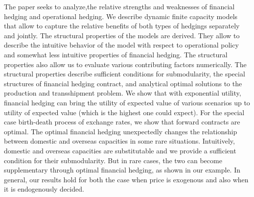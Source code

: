 \documentclass[mnsc,nonblindrev,copyedit]{informs2_wz} %
\begin{document}
The paper seeks to analyze,the relative strengths and weaknesses of financial hedging and operational hedging.  We describe dynamic finite capacity models that allow to capture the relative benefits of both types of hedgings separately and jointly.  The structural properties of the models are derived.  They allow to describe the intuitive behavior of the model with respect to operational policy and somewhat less intuitive properties of financial hedging.  The structural properties also allow us to evaluate various contributing factors numerically.  The structural properties describe sufficient conditions for submodularity, the special structures of financial hedging contract, and analytical optimal solutions to the production and transshipment problem.  We show that with exponential utility, financial hedging can bring the utility of expected value of various scenarios up to utility of expected value (which is the highest one could expect).  For the special case birth-death process of exchange rates, we show that forward contracts are optimal.  The optimal financial hedging unexpectedly changes the relationship between domestic and overseas capacities in some rare situations.  Intuitively, domestic and overseas capacities are substitutable and we provide a sufficient condition for their submodularity.  But in rare cases, the two can become supplementary through optimal financial hedging, as shown in our example.
In general, our results hold for both the case when price is exogenous and also when it is endogenously decided.
\end{document}

